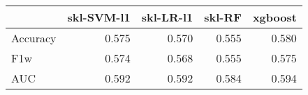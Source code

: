 \begin{tabular}{lrrrr}
\toprule
{} &  skl-SVM-l1 &  skl-LR-l1 &  skl-RF &  xgboost \\
\midrule
Accuracy &       0.575 &      0.570 &   0.555 &    0.580 \\
F1w      &       0.574 &      0.568 &   0.555 &    0.575 \\
AUC      &       0.592 &      0.592 &   0.584 &    0.594 \\
\bottomrule
\end{tabular}
